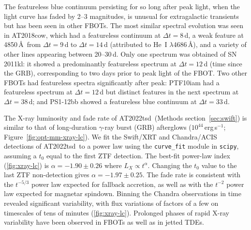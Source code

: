 \documentclass{nature_plusfigure}
\newcommand{\at}{AT2022tsd}
\begin{document}
\begin{methods}
The featureless blue continuum persisting for so long after peak light, when the light curve has faded by 2--3 magnitudes, is unusual for extragalactic transients but has been seen in other FBOTs.
The most similar spectral evolution was seen in AT2018cow\cite{Perley2019}, which had a featureless continuum at $\Delta t=8$\,d, a weak feature at 4850\,\AA\ from $\Delta t=9$\,d to $\Delta t=14$\,d (attributed to He~I $\lambda$4686\,\AA), and a variety of other lines appearing between 20--30\,d. 
Only one spectrum was obtained of SN\,2011kl: it showed a predominantly featureless spectrum at $\Delta t=12$\,d (time since the GRB), corresponding to two days prior to peak light of the FBOT.
Two other FBOTs had featureless spectra significantly after peak: PTF10iam\cite{Arcavi2016} had a featureless spectrum at $\Delta t=12$\,d but distinct features in the next spectrum at $\Delta t=38$\,d; and PS1-12bb\cite{Drout2014} showed a featureless blue continuum at $\Delta t=33$\,d.

The X-ray luminosity and fade rate of \at\ (Methods section~\ref{sec:swift}) is similar to that of long-duration $\gamma$-ray burst (GRB) afterglows ($10^{44}\,$erg\,s$^{-1}$; Figure~\ref{fig:opt-mm-xray-lc}). We fit the Swift/XRT and Chandra/ACIS detections of \at\ to a power law using the \texttt{curve\_fit} module in \texttt{scipy}, assuming a $t_0$ equal to the first ZTF detection. The best-fit power-law index (\ref{fig:xray-lc}) is $\alpha=-1.90\pm0.26$ where $L_X \propto t^{\alpha}$.
Changing the $t_0$ value to the last ZTF non-detection gives $\alpha=-1.97\pm0.25$.
The fade rate is consistent with the $t^{-5/3}$ power law expected for fallback accretion\cite{Phinney1989}, as well as with the $t^{-2}$ power law expected for magnetar spindown.
Binning the Chandra observations in time revealed significant variability, with flux variations of factors of a few on timescales of tens of minutes (\ref{fig:xray-lc}). Prolonged phases of rapid X-ray variability have been observed in FBOTs\cite{RiveraSandoval2018,Margutti2019,Ho2019,Yao2022} as well as in jetted TDEs\cite{Levan2011,Burrows2011,Cenko2012}.


\end{methods}
\end{document}

